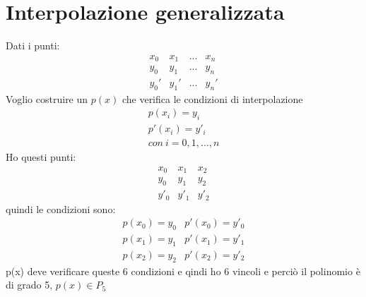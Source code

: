 \documentclass[a4paper, portrait]{book}
\numberwithin{equation}{chapter} %
\begin{document}
\section*{Interpolazione generalizzata}
Dati i punti:
$$\begin{matrix}
    x_0&x_1&...&x_n\\
    y_0&y_1&...&y_n\\
    y_0'&y_1'&...&y_n'
\end{matrix}$$ 
Voglio costruire un $p(x)$ che verifica le condizioni di interpolazione
\begin{gather}
    p(x_i) = y_i\\
    p'(x_i) = y'_i\\
    con \ i = 0,1,...,n
\end{gather}
Ho questi punti:
$$\begin{matrix}
    x_0&x_1&x_2\\
    y_0&y_1&y_2\\
    y'_0&y'_1&y'_2
\end{matrix}$$
quindi le condizioni sono:
\begin{equation}
    \begin{matrix}
        p(x_0) = y_0&p'(x_0) = y'_0\\
        p(x_1) = y_1&p'(x_1) = y'_1\\
        p(x_2) = y_2&p'(x_2) = y'_2
    \end{matrix}
\end{equation}
p(x) deve verificare queste 6 condizioni e qindi ho 6 vincoli e perciò il polinomio è di grado 5, $p(x) \in P_5$
\end{document}
